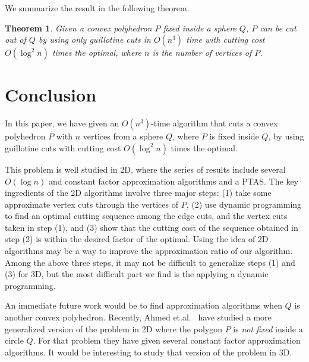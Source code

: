\documentclass{llncs}
\newtheorem{thm}{Theorem}
\begin{document}
We summarize the result in the following theorem.

\begin{thm}
Given a convex polyhedron $P$ fixed inside a sphere $Q$, $P$ can be cut out of $Q$ by using only
guillotine cuts in $O(n^3)$ time with cutting cost $O(\log^2n)$ times the optimal,
where $n$ is the number of vertices of $P$.
\end{thm}


\section{Conclusion}
\label{se:con}
In this paper, we have given an $O(n^3)$-time algorithm that cuts a convex polyhedron $P$
with $n$ vertices from a sphere $Q$, where $P$ is fixed inside $Q$, by using guillotine cuts
with cutting cost $O(\log^2 n)$ times the optimal.


This problem is well studied in 2D, where the series of results include several $O(\log n)$ 
and constant factor approximation algorithms and a PTAS.
The key ingredients of the 2D algorithms involve three major steps: 
(1) take some approximate vertex cuts through the vertices of $P$, 
(2) use dynamic programming to find an optimal cutting sequence among the edge cuts,
and the vertex cuts taken in step (1), and 
(3) show that the cutting cost of the sequence obtained in step (2)
is within the desired factor of the optimal.
Using the idea of 2D algorithms may be a way to improve the approximation ratio of our algorithm.
Among the above three steps, it may not be difficult to generalize steps (1) and (3) for 3D,
but the most difficult part we find is the applying a dynamic programming.

An immediate future work would be to find approximation algorithms when $Q$ is another convex polyhedron.
Recently, Ahmed et.al.~\cite{ABHK10} have studied a more generalized version of the problem in 2D
where the polygon $P$ is \emph{not fixed} inside a circle $Q$.
For that problem they have given several constant factor approximation algorithms. 
It would be interesting to study that version of the problem in 3D.







\end{document}
